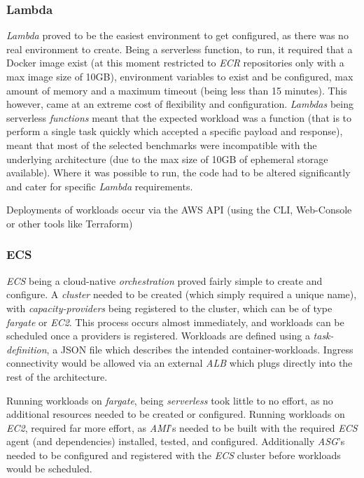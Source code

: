 \subsubsection{Lambda}
\textit{Lambda} proved to be the easiest environment to get configured, as there was no real environment to create. Being a serverless function,
to run, it required that a Docker image exist (at this moment restricted to \textit{ECR} repositories only with a max image size of 10GB), environment variables to exist and be configured, max amount of memory
and a maximum timeout (being less than 15 minutes). This however, came at an extreme cost of flexibility and configuration.
\textit{Lambdas} being serverless \emph{functions} meant that the expected workload was a function (that is to perform a single task quickly which accepted a specific payload and response),
meant that most of the selected benchmarks were incompatible with the underlying architecture (due to the max size of 10GB of ephemeral storage available).
Where it was possible to run, the code had to be altered significantly and cater for specific \textit{Lambda} requirements.

Deployments of workloads occur via the AWS API (using the CLI, Web-Console or other tools like Terraform)

\subsubsection{ECS}
\textit{ECS} being a cloud-native \textit{orchestration} proved fairly simple to create and configure.
A \emph{cluster} needed to be created (which simply required a unique name), with \textit{capacity-providers} being registered to the cluster,
which can be of type \textit{fargate} or \textit{EC2}.
This process occurs almost immediately, and workloads can be scheduled once a providers is registered.
Workloads are defined using a \textit{task-definition}, a JSON file which describes the intended container-workloads.
Ingress connectivity would be allowed via an external \textit{ALB} which plugs directly into the rest of the architecture.

Running workloads on \textit{fargate}, being \textit{serverless} took little to no effort, as no additional resources needed to be created or configured.
Running workloads on \textit{EC2}, required far more effort, as \textit{AMI}'s needed to be built with the required \textit{ECS} agent (and dependencies) installed, tested,
and configured. Additionally \textit{ASG}'s needed to be configured and registered with the \textit{ECS} cluster before workloads would be scheduled.

